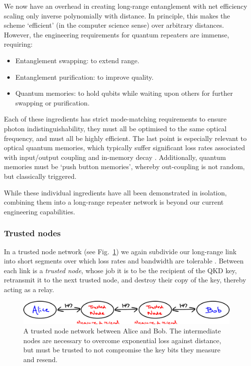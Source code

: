 We now have an overhead in creating long-range entanglement with net efficiency scaling only inverse polynomially with distance. In principle, this makes the scheme `efficient' (in the computer science sense) over arbitrary distances. However, the engineering requirements for quantum repeaters are immense, requiring:
\begin{itemize}
	\item Entanglement swapping: to extend range.
	\item Entanglement purification: to improve quality.
	\item Quantum memories: to hold qubits while waiting upon others for further swapping or purification.
\end{itemize}

Each of these ingredients has strict mode-matching requirements to ensure photon indistinguishability, they must all be optimised to the same optical frequency, and must all be highly efficient. The last point is especially relevant to optical quantum memories, which typically suffer significant loss rates associated with input/output coupling and in-memory decay \cite{???}. Additionally, quantum memories must be `push button memories', whereby out-coupling is not random, but classically triggered.

While these individual ingredients have all been demonstrated in isolation, combining them into a long-range repeater network is beyond our current engineering capabilities.

\subsubsection{Trusted nodes} \label{trusted-nodes}

In a trusted node network (see Fig.~\ref{fig:trusted_node}) we again subdivide our long-range link into short segments over which loss rates and bandwidth are tolerable \cite{bib:salvail2010security}. Between each link is a \emph{trusted node}, whose job it is to be the recipient of the QKD key, retransmit it to the next trusted node, and destroy their copy of the key, thereby acting as a relay.

\begin{figure}[!htb]
	\centering
	\includegraphics[width=2\columnwidth]{figures/Trusted_node}
	\caption{A trusted node network between Alice and Bob. The intermediate	nodes are necessary to overcome exponential loss against distance, but must be trusted to not compromise the key bits they measure and resend.} \label{fig:trusted_node}
\end{figure}

